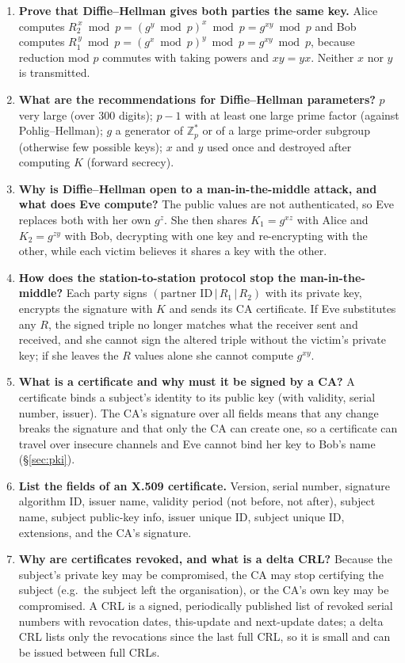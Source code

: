 \begin{enumerate}[leftmargin=1.6em,itemsep=3pt]
  \item \textbf{Prove that Diffie--Hellman gives both parties the same key.} Alice computes $R_2^{\,x} \bmod p = (g^y \bmod p)^x \bmod p = g^{xy} \bmod p$ and Bob computes $R_1^{\,y} \bmod p = (g^x \bmod p)^y \bmod p = g^{xy} \bmod p$, because reduction mod $p$ commutes with taking powers and $xy = yx$. Neither $x$ nor $y$ is transmitted.
  \item \textbf{What are the recommendations for Diffie--Hellman parameters?} $p$ very large (over 300 digits); $p - 1$ with at least one large prime factor (against Pohlig--Hellman); $g$ a generator of $\mathbb{Z}_p^*$ or of a large prime-order subgroup (otherwise few possible keys); $x$ and $y$ used once and destroyed after computing $K$ (forward secrecy).
  \item \textbf{Why is Diffie--Hellman open to a man-in-the-middle attack, and what does Eve compute?} The public values are not authenticated, so Eve replaces both with her own $g^z$. She then shares $K_1 = g^{xz}$ with Alice and $K_2 = g^{zy}$ with Bob, decrypting with one key and re-encrypting with the other, while each victim believes it shares a key with the other.
  \item \textbf{How does the station-to-station protocol stop the man-in-the-middle?} Each party signs $(\text{partner ID} \,|\, R_1 \,|\, R_2)$ with its private key, encrypts the signature with $K$ and sends its CA certificate. If Eve substitutes any $R$, the signed triple no longer matches what the receiver sent and received, and she cannot sign the altered triple without the victim's private key; if she leaves the $R$ values alone she cannot compute $g^{xy}$.
  \item \textbf{What is a certificate and why must it be signed by a CA?} A certificate binds a subject's identity to its public key (with validity, serial number, issuer). The CA's signature over all fields means that any change breaks the signature and that only the CA can create one, so a certificate can travel over insecure channels and Eve cannot bind her key to Bob's name (\S\ref{sec:pki}).
  \item \textbf{List the fields of an X.509 certificate.} Version, serial number, signature algorithm ID, issuer name, validity period (not before, not after), subject name, subject public-key info, issuer unique ID, subject unique ID, extensions, and the CA's signature.
  \item \textbf{Why are certificates revoked, and what is a delta CRL?} Because the subject's private key may be compromised, the CA may stop certifying the subject (e.g.\ the subject left the organisation), or the CA's own key may be compromised. A CRL is a signed, periodically published list of revoked serial numbers with revocation dates, this-update and next-update dates; a delta CRL lists only the revocations since the last full CRL, so it is small and can be issued between full CRLs.

\end{enumerate}
